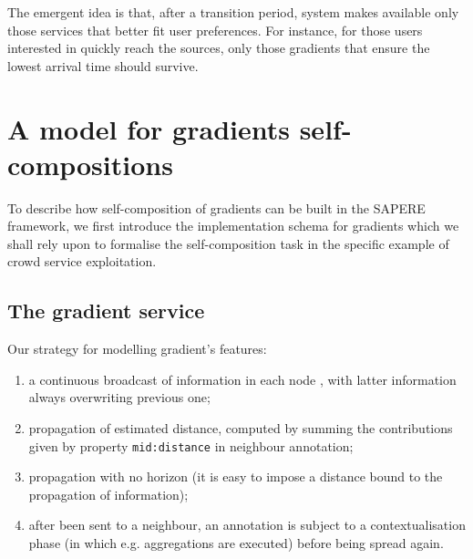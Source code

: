 \documentclass[12pt,a4paper,twoside,openright]{book}
\begin{document}
\noindent The emergent idea is that, after a transition period, system makes available only those services that better fit user preferences. For instance, for those users interested in quickly reach the sources, only those gradients that ensure the lowest arrival time should survive.


\section{A model for gradients self-compositions}
To describe how self-composition of gradients can be built in the SAPERE framework, we first introduce the implementation schema for gradients which we shall rely upon to formalise the self-composition task in the specific example of crowd service exploitation.

\subsection{The gradient service}
Our strategy for modelling gradient's features: 
\begin{enumerate}
 \item a continuous broadcast of information in each node \cite{flexiblegradients}, with latter information always overwriting previous one;
 \item propagation of estimated distance, computed by summing the contributions given by property \texttt{mid:distance} in neighbour annotation;
 \item propagation with no horizon (it is easy to impose a distance bound to the propagation of information);
 \item after been sent to a neighbour, an annotation is subject to a contextualisation phase (in which e.g. aggregations are executed) before being spread again.
\end{enumerate}
\end{document}
